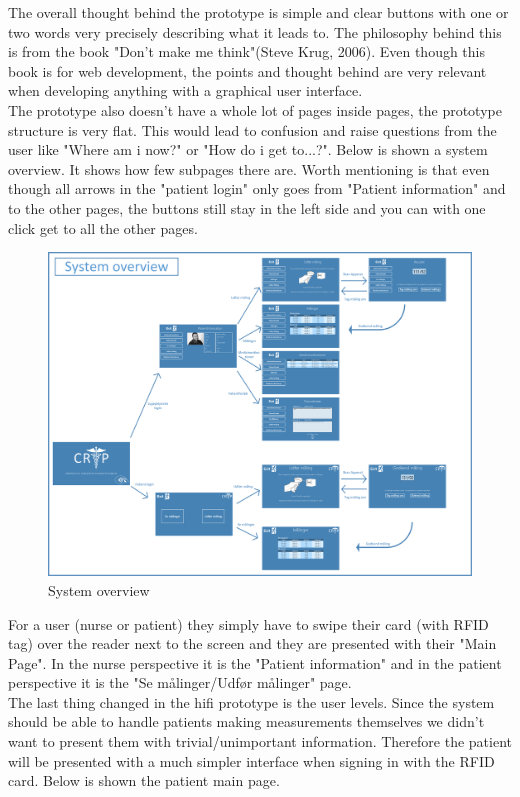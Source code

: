 The overall thought behind the prototype is simple and clear buttons with one or two words very precisely describing what it leads to. The philosophy behind this is from the book "Don't make me think"(Steve Krug, 2006). Even though this book is for web development, the points and thought behind are very relevant when developing anything with a graphical user interface.\\
The prototype also doesn't have a whole lot of pages inside pages, the prototype structure is very flat. This would lead to confusion and raise questions from the user like "Where am i now?" or "How do i get to...?". Below is shown a system overview. It shows how few subpages there are. Worth mentioning is that even though all arrows in the "patient login" only goes from "Patient information" and to the other pages, the buttons still stay in the left side and you can with one click get to all the other pages.\\
\begin{figure}[H]
\centering
\includegraphics[width=1\textwidth]{billeder/system_hifi.png}
\caption{System overview}
\end{figure}
For a user (nurse or patient) they simply have to swipe their card (with RFID tag) over the reader next to the screen and they are presented with their "Main Page". In the nurse perspective it is the "Patient information" and in the patient perspective it is the "Se målinger/Udfør målinger" page.\\
The last thing changed in the hifi prototype is the user levels. Since the system should be able to handle patients making measurements themselves we didn't want to present them with trivial/unimportant information. Therefore the patient will be presented with a much simpler interface when signing in with the RFID card. Below is shown the patient main page.\\


